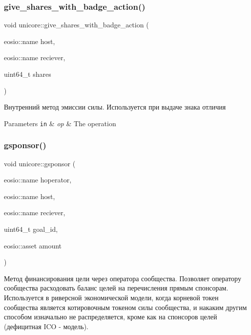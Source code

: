 \subsubsection{\texorpdfstring{give\+\_\+shares\+\_\+with\+\_\+badge\+\_\+action()}{give\_shares\_with\_badge\_action()}}
{\footnotesize\ttfamily void unicore\+::give\+\_\+shares\+\_\+with\+\_\+badge\+\_\+action (\begin{DoxyParamCaption}\item[{eosio\+::name}]{host,  }\item[{eosio\+::name}]{reciever,  }\item[{uint64\+\_\+t}]{shares }\end{DoxyParamCaption})\hspace{0.3cm}{\ttfamily [static]}}



Внутренний метод эмиссии силы. Используется при выдаче знака отличия 


\begin{DoxyParams}[1]{Parameters}
\mbox{\tt in}  & {\em op} & The operation \\
\hline
\end{DoxyParams}
\mbox{\label{classunicore_a621817942c7b2758963d4147170b3c60}} 
\subsubsection{\texorpdfstring{gsponsor()}{gsponsor()}}
{\footnotesize\ttfamily void unicore\+::gsponsor (\begin{DoxyParamCaption}\item[{eosio\+::name}]{hoperator,  }\item[{eosio\+::name}]{host,  }\item[{eosio\+::name}]{reciever,  }\item[{uint64\+\_\+t}]{goal\+\_\+id,  }\item[{eosio\+::asset}]{amount }\end{DoxyParamCaption})}



Метод финансирования цели через оператора сообщества. Позволяет оператору сообщества расходовать баланс целей на перечисления прямым спонсорам. Используется в риверсной экономической модели, когда корневой токен сообщества является котировочным токеном силы сообщества, и накаким другим способом изначально не распределяется, кроме как на спонсоров целей (дефицитная I\+CO -\/ модель). 


